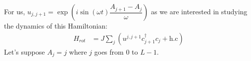 \documentclass[11pt,a4paper]{article}
\begin{document}
For us, $u_{j, j+1}= \exp\left(i \sin(\omega t) \dfrac{A_{j+1}- A_j}{\omega}\right)$ as we are interested in studying the dynamics of this Hamiltonian:
\begin{align*}
H_{rot}&= J\sum_j   ( u^{j, j+1} c_{j+1}^{\dagger} c_j + \mbox{h.c}) 
\end{align*}
Let's suppose $A_j= j$ where $j$ goes from $0$ to $L-1$.


 


%
\end{document}
